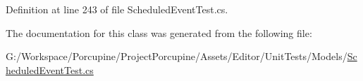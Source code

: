 Definition at line 243 of file Scheduled\+Event\+Test.\+cs.



The documentation for this class was generated from the following file\+:\begin{DoxyCompactItemize}
\item 
G\+:/\+Workspace/\+Porcupine/\+Project\+Porcupine/\+Assets/\+Editor/\+Unit\+Tests/\+Models/\hyperlink{_scheduled_event_test_8cs}{Scheduled\+Event\+Test.\+cs}\end{DoxyCompactItemize}
